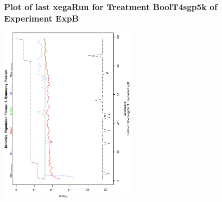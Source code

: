  \begin{frame}
 \frametitle{ Plot of last xegaRun for Treatment BoolT4sgp5k of Experiment ExpB }
 \begin{center}
\includegraphics[width=0.5\textwidth, angle=-90]
{ExpBPlotPopStatsFigure023.eps}
 \end{center}
 \label{report/ExpBPlotPopStatsFigure023.eps}  
 \end{frame}

